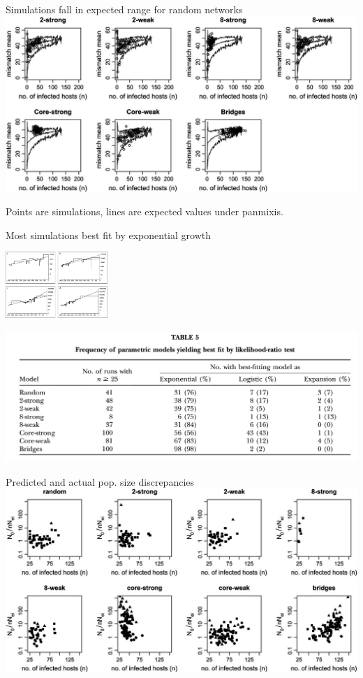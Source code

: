 \documentclass{beamer}
\begin{document}
\begin{frame}{Simulations fall in expected range for random networks}
  \includegraphics[width=\textwidth]{F3}

  Points are simulations, lines are expected values under panmixis.
\end{frame}

\begin{frame}{Most simulations best fit by exponential growth}
  \centerline{\includegraphics[height=2.5cm, trim=0 15cm 0 0, clip]{F4}}

  \includegraphics[width=\textwidth]{T5}
\end{frame}

\begin{frame}{Predicted and actual pop. size discrepancies}
  \includegraphics[width=\textwidth]{F5}
\end{frame}
\end{document}
